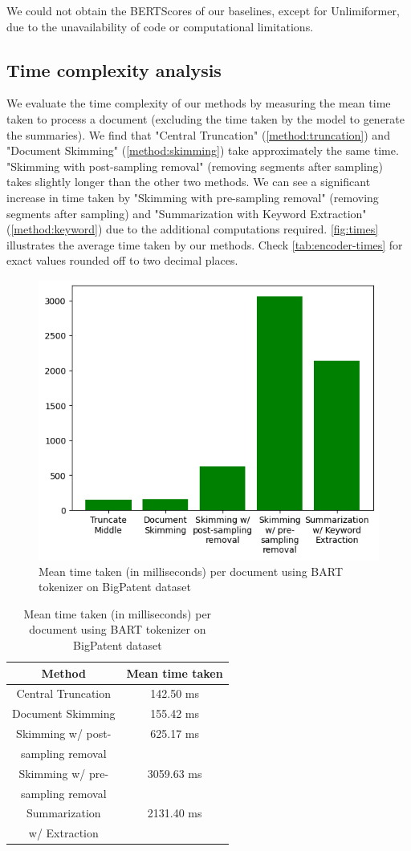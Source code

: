 We could not obtain the BERTScores of our baselines, except for Unlimiformer, due to the unavailability of code or computational limitations.


\subsection*{Time complexity analysis}

We evaluate the time complexity of our methods by measuring the mean time taken to process a document (excluding the time taken by the model to generate the summaries).
We find that "Central Truncation" (\autoref{method:truncation}) and "Document Skimming" (\autoref{method:skimming}) take approximately the same time.
"Skimming with post-sampling removal" (removing segments after sampling) takes slightly longer than the other two methods.
We can see a significant increase in time taken by "Skimming with pre-sampling removal" (removing segments after sampling) and "Summarization with Keyword Extraction" (\autoref{method:keyword}) due to the additional computations required.
\autoref{fig:times} illustrates the average time taken by our methods.
Check \autoref{tab:encoder-times} for exact values rounded off to two decimal places.

\begin{figure}[!ht]
  \centering
  \includegraphics[width=.48\textwidth]{images/encoder-times.png}
  \caption{Mean time taken (in milliseconds) per document using BART tokenizer on BigPatent dataset}
  \label{fig:times}
\end{figure}

\begin{table}[!ht]
  \centering

  \begin{tabular}{c c}
    \hline
    Method & Mean time taken \\
    \hline
    Central Truncation & 142.50 ms \\
    Document Skimming & 155.42 ms \\
    Skimming w/ post- & 625.17 ms \\
    sampling removal & \\
    Skimming w/ pre- & 3059.63 ms \\
    sampling removal & \\
    Summarization & 2131.40 ms \\
    w/ Extraction & \\
    \hline
  \end{tabular}

  \caption{Mean time taken (in milliseconds) per document using BART tokenizer on BigPatent dataset}
  \label{tab:encoder-times}
\end{table}
